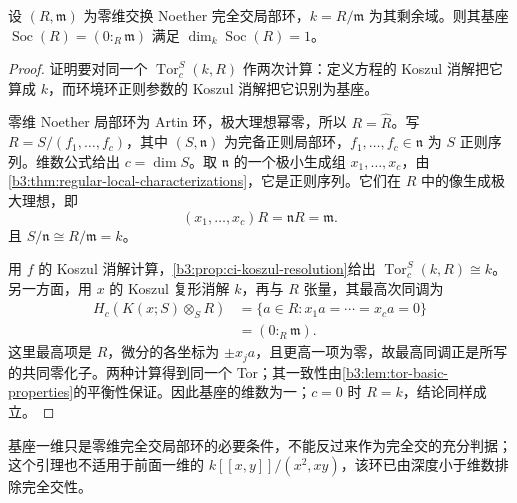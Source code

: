 \begin{lemma}\label{b3:lem:artinian-ci-socle}
	设 \((R,\mathfrak m)\) 为零维交换 Noether 完全交局部环，\(k=R/\mathfrak m\) 为其剩余域。则其基座 \(\operatorname{Soc}(R)=(0:_R\mathfrak m)\) 满足 \(\dim_k\operatorname{Soc}(R)=1\)。
\end{lemma}
\begin{proof}
	证明要对同一个 \(\operatorname{Tor}_c^S(k,R)\) 作两次计算：定义方程的 Koszul 消解把它算成 \(k\)，而环境环正则参数的 Koszul 消解把它识别为基座。

	零维 Noether 局部环为 Artin 环，极大理想幂零，所以 \(R=\widehat R\)。写 \(R=S/(f_1,\ldots,f_c)\)，其中 \((S,\mathfrak n)\) 为完备正则局部环，\(f_1,\ldots,f_c\in\mathfrak n\) 为 \(S\) 正则序列。维数公式给出 \(c=\dim S\)。取 \(\mathfrak n\) 的一个极小生成组 \(x_1,\ldots,x_c\)，由\cref{b3:thm:regular-local-characterizations}，它是正则序列。它们在 \(R\) 中的像生成极大理想，即
	\[
		(x_1,\ldots,x_c)R=\mathfrak nR=\mathfrak m.
	\]
	且 \(S/\mathfrak n\cong R/\mathfrak m=k\)。

	用 \(f\) 的 Koszul 消解计算，\cref{b3:prop:ci-koszul-resolution}给出 \(\operatorname{Tor}_c^S(k,R)\cong k\)。另一方面，用 \(x\) 的 Koszul 复形消解 \(k\)，再与 \(R\) 张量，其最高次同调为
	\[
		\begin{aligned}
			H_c(K(x;S)\otimes_SR) &=\{a\in R:x_1a=\cdots=x_ca=0\}\\
			&=(0:_R\mathfrak m).
		\end{aligned}
	\]
	这里最高项是 \(R\)，微分的各坐标为 \(\pm x_ja\)，且更高一项为零，故最高同调正是所写的共同零化子。两种计算得到同一个 Tor；其一致性由\cref{b3:lem:tor-basic-properties}的平衡性保证。因此基座的维数为一；\(c=0\) 时 \(R=k\)，结论同样成立。
\end{proof}

基座一维只是零维完全交局部环的必要条件，不能反过来作为完全交的充分判据；这个引理也不适用于前面一维的 \(k[\![x,y]\!]/(x^2,xy)\)，该环已由深度小于维数排除完全交性。


